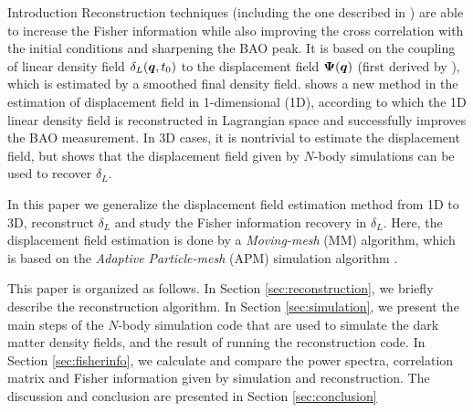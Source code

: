 \begin{section}{Introduction}
Reconstruction techniques (including the one described in 
\cite{bib:HarnoisD2013}) are able to increase the Fisher information
while also improving the cross correlation with the initial conditions
and sharpening the BAO peak. It is based on the coupling of linear
density field $\delta_L(\boldsymbol{q},t_0)$ to the displacement field
$\boldsymbol\Psi(\boldsymbol{q})$ (first derived by \cite{bib:Zel1970}), which
is estimated by a smoothed final density field.
\cite{bib:Zhu2016} shows a new method in the estimation of displacement
field in 1-dimensional (1D), according to which the 1D linear density
field is reconstructed in Lagrangian space and successfully improves 
the BAO measurement. In 3D cases, it is nontrivial to estimate
the displacement field, but \cite{bib:Yu2016} shows that the displacement
field given by $N$-body simulations can be used to recover $\delta_L$.

In this paper we generalize the displacement field estimation method
from 1D \citep{bib:Zhu2016} to 3D, reconstruct $\delta_L$ and study
the Fisher information recovery in $\delta_L$. Here, the displacement field
estimation is done by a \textit{Moving-mesh} (MM) algorithm, which is based on
the \textit{Adaptive Particle-mesh} (APM) simulation algorithm \citep{bib:Pen1995,bib:Pen1998}.

This paper is organized as follows. 
In Section \ref{sec:reconstruction}, we briefly describe the reconstruction algorithm.
In Section \ref{sec:simulation}, we present the main steps of the $N$-body 
simulation code that are used to simulate the dark matter density fields, 
and the result of running the reconstruction code.
In Section \ref{sec:fisherinfo}, we calculate and compare the power spectra, 
correlation matrix and Fisher information given by simulation and reconstruction.
The discussion and conclusion are presented in Section \ref{sec:conclusion}

\end{section}
